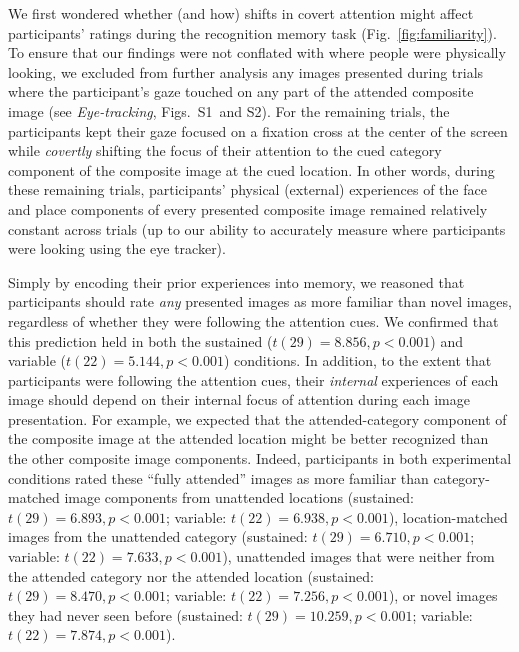 \documentclass[english]{article}
\newcommand{\gazeLocations}{S1}
\newcommand{\excludedTrials}{S2}
\begin{document}
We first wondered whether (and how) shifts in covert attention might affect
participants' ratings during the recognition memory task
(Fig.~\ref{fig:familiarity}). To ensure that our findings were not conflated
with where people were physically looking, we excluded from further analysis
any images presented during trials where the participant's gaze touched on any
part of the attended composite image (see \textit{Eye-tracking},
Figs.~\gazeLocations~and \excludedTrials). For the remaining trials, the
participants kept their gaze focused on a fixation cross at the center of the
screen while \textit{covertly} shifting the focus of their attention to the
cued category component of the composite image at the cued location. In other
words, during these remaining trials, participants' physical (external)
experiences of the face and place components of every presented composite image
remained relatively constant across trials (up to our ability to accurately
measure where participants were looking using the eye tracker). 

Simply by encoding their prior experiences into memory, we reasoned that
participants should rate \textit{any} presented images as more familiar than
novel images, regardless of whether they were following the attention cues. We
confirmed that this prediction held in both the sustained ($t(29) = 8.856, p <
0.001$) and variable ($t(22) = 5.144, p < 0.001$) conditions. In addition, to
the extent that participants were following the attention cues, their
\textit{internal} experiences of each image should depend on their internal
focus of attention during each image presentation. For example, we expected
that the attended-category component of the composite image at the attended
location might be better recognized than the other composite image components.
Indeed, participants in both experimental conditions rated these ``fully
attended'' images as more familiar than category-matched image components from
unattended locations (sustained: $t(29) = 6.893, p < 0.001$; variable: $t(22) =
6.938, p < 0.001$), location-matched images from the unattended category
(sustained: $t(29) = 6.710, p < 0.001$; variable: $t(22) = 7.633, p < 0.001$),
unattended images that were neither from the attended category nor the attended
location (sustained: $t(29) = 8.470, p < 0.001$; variable: $t(22) = 7.256, p <
0.001$), or novel images they had never seen before (sustained: $t(29) =
10.259, p < 0.001$; variable: $t(22) = 7.874, p < 0.001$).
\end{document}
